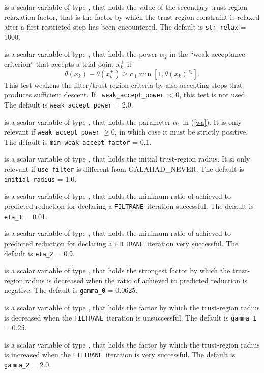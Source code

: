 \documentclass{galahad}
\newcommand{\packagename}{FILTRANE}
\newcommand{\sym}{\sf\small}
\newcommand{\filtrane}{{\tt \packagename}}
\begin{document}
\begin{description}
 is a scalar variable of type \realdp, that holds the
value of the secondary trust-region relaxation factor, that is the factor by
which the trust-region constraint is relaxed after a first restricted step has
been encountered.
The default is {\tt str\_relax} = 1000.

 is a scalar variable of type \realdp, 
that holds the power $\alpha_2$ in the ``weak acceptance criterion'' that
accepts a trial point $x_k^+$ if
\begin{equation}\label{wa}
\theta(x_k)-\theta(x_k^+) \geq 
\alpha_1 \min\left[ 1, \theta(x_k)^{\alpha_2} \right]. 
\end{equation}
This test weakens the filter/trust-region criteria 
by also accepting steps that produces sufficient descent.  If {\tt
weak\_accept\_power} $<0$, this test is not used.
The default is {\tt weak\_accept\_power} = 2.0.

 is a scalar variable of type \realdp, 
that holds the parameter $\alpha_1$ in (\ref{wa}).  It is only relevant
if {\tt weak\_accept\_power} $\geq 0$, in which case it must be strictly
positive.
The default is {\tt min\_weak\_accept\_factor} = 0.1.

 is a scalar variable of type \realdp, that
holds the initial trust-region radius. It si only relevant if
{\tt use\_filter} is different from {\sym GALAHAD\_NEVER}.
The default is {\tt initial\_radius} = 1.0.

 is a scalar variable of type \realdp, that holds the
minimum ratio of achieved to predicted reduction
for declaring a \filtrane\ iteration successful.
The default is {\tt eta\_1} = 0.01.

 is a scalar variable of type \realdp, that holds the
minimum ratio of achieved to predicted reduction
for declaring a \filtrane\ iteration very successful.
The default is {\tt eta\_2} = 0.9.

 is a scalar variable of type \realdp, that holds the
strongest factor by which the trust-region radius is decreased when the ratio
of achieved to predicted reduction is negative.
The default is {\tt gamma\_0} = 0.0625.

 is a scalar variable of type \realdp, that holds the
factor by which the trust-region radius is decreased when the \filtrane\
iteration is unsuccessful.
The default is {\tt gamma\_1} = 0.25.

 is a scalar variable of type \realdp, that holds the
factor by which the trust-region radius is increased when the \filtrane\
iteration is very successful.
The default is {\tt gamma\_2} = 2.0.


\end{description}
\end{document}
